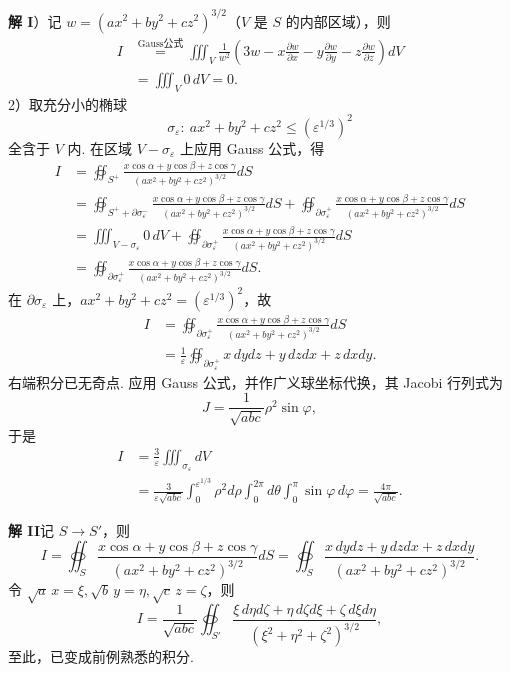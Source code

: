 \documentclass[UTF8,12pt,a4paper,fontset=fandol]{ctexart}
\providecommand{\xlongequal}[1]{\overset{#1}{=}}
\begin{document}
\noindent\textbf{解 I}）记 $w=(ax^2+by^2+cz^2)^{3/2}$（$V$ 是 $S$ 的内部区域），则
\[
\begin{aligned}
I&\xlongequal{\text{Gauss公式}}\iiint_V\frac1{w^2}\left(3w-x\frac{\partial w}{\partial x}-y\frac{\partial w}{\partial y}-z\frac{\partial w}{\partial z}\right)dV\\
&=\iiint_V0\,dV=0.
\end{aligned}
\]
2）取充分小的椭球
\[
\sigma_\varepsilon:\ ax^2+by^2+cz^2\le(\varepsilon^{1/3})^2
\]
全含于 $V$ 内. 在区域 $V-\sigma_\varepsilon$ 上应用 Gauss 公式，得
\[
\begin{aligned}
I&=\oiint_{S^+}\frac{x\cos\alpha+y\cos\beta+z\cos\gamma}{(ax^2+by^2+cz^2)^{3/2}}dS\\
&=\oiint_{S^++\partial\sigma_\varepsilon^-}\frac{x\cos\alpha+y\cos\beta+z\cos\gamma}{(ax^2+by^2+cz^2)^{3/2}}dS
+\oiint_{\partial\sigma_\varepsilon^+}\frac{x\cos\alpha+y\cos\beta+z\cos\gamma}{(ax^2+by^2+cz^2)^{3/2}}dS\\
&=\iiint_{V-\sigma_\varepsilon}0\,dV
+\oiint_{\partial\sigma_\varepsilon^+}\frac{x\cos\alpha+y\cos\beta+z\cos\gamma}{(ax^2+by^2+cz^2)^{3/2}}dS\\
&=\oiint_{\partial\sigma_\varepsilon^+}\frac{x\cos\alpha+y\cos\beta+z\cos\gamma}{(ax^2+by^2+cz^2)^{3/2}}dS.
\end{aligned}
\]
在 $\partial\sigma_\varepsilon$ 上，$ax^2+by^2+cz^2=(\varepsilon^{1/3})^2$，故
\[
\begin{aligned}
I&=\oiint_{\partial\sigma_\varepsilon^+}\frac{x\cos\alpha+y\cos\beta+z\cos\gamma}{(ax^2+by^2+cz^2)^{3/2}}dS\\
&=\frac1\varepsilon\oiint_{\partial\sigma_\varepsilon^+}x\,dydz+y\,dzdx+z\,dxdy.
\end{aligned}
\]
右端积分已无奇点. 应用 Gauss 公式，并作广义球坐标代换，其 Jacobi 行列式为
\[
J=\frac1{\sqrt{abc}}\rho^2\sin\varphi,
\]
于是
\[
\begin{aligned}
I&=\frac3\varepsilon\iiint_{\sigma_\varepsilon}dV\\
&=\frac3{\varepsilon\sqrt{abc}}\int_0^{\varepsilon^{1/3}}\rho^2d\rho
\int_0^{2\pi}d\theta\int_0^\pi\sin\varphi\,d\varphi
=\frac{4\pi}{\sqrt{abc}}.
\end{aligned}
\]

\noindent\textbf{解 II}\quad 记 $S\to S'$，则
\[
I=\oiint_S\frac{x\cos\alpha+y\cos\beta+z\cos\gamma}{(ax^2+by^2+cz^2)^{3/2}}dS
=\oiint_S\frac{x\,dydz+y\,dzdx+z\,dxdy}{(ax^2+by^2+cz^2)^{3/2}}.
\]
令 $\sqrt a\,x=\xi,\sqrt b\,y=\eta,\sqrt c\,z=\zeta$，则
\[
I=\frac1{\sqrt{abc}}\oiint_{S'}\frac{\xi\,d\eta d\zeta+\eta\,d\zeta d\xi+\zeta\,d\xi d\eta}{(\xi^2+\eta^2+\zeta^2)^{3/2}},
\]
至此，已变成前例熟悉的积分.
\end{document}
